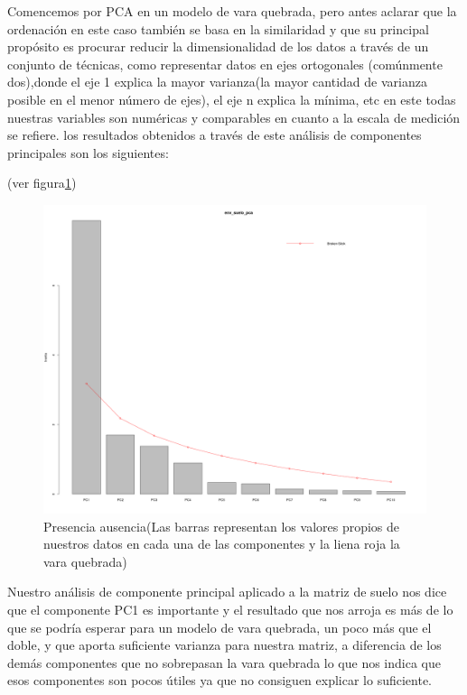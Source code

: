 \documentclass[11pt,]{article}
\begin{document}
Comencemos por PCA en un modelo de vara quebrada, pero antes aclarar que
la ordenación en este caso también se basa en la similaridad y que su
principal propósito es procurar reducir la dimensionalidad de los datos
a través de un conjunto de técnicas, como representar datos en ejes
ortogonales (comúnmente dos),donde el eje 1 explica la mayor varianza(la
mayor cantidad de varianza posible en el menor número de ejes), el eje n
explica la mínima, etc en este todas nuestras variables son numéricas y
comparables en cuanto a la escala de medición se refiere. los resultados
obtenidos a través de este análisis de componentes principales son los
siguientes:

(ver figura\ref{fig:PCA_1})

\begin{figure}
\centering
\includegraphics{PCA_1.png}
\caption{\label{fig:PCA_1}Presencia ausencia(Las barras representan los
valores propios de nuestros datos en cada una de las componentes y la
liena roja la vara quebrada)}
\end{figure}

Nuestro análisis de componente principal aplicado a la matriz de suelo
nos dice que el componente PC1 es importante y el resultado que nos
arroja es más de lo que se podría esperar para un modelo de vara
quebrada, un poco más que el doble, y que aporta suficiente varianza
para nuestra matriz, a diferencia de los demás componentes que no
sobrepasan la vara quebrada lo que nos indica que esos componentes son
pocos útiles ya que no consiguen explicar lo suficiente.
\end{document}
